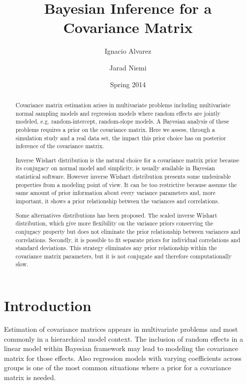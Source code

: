 \documentclass[a4paper]{article}
\title{Bayesian Inference for a Covariance Matrix}
\author{Ignacio Alvarez \and Jarad Niemi \nacho{We should probably include Matt on this.}}
\date{ Spring 2014 }
\begin{document}
 
\maketitle 


\begin{abstract}
Covariance matrix estimation arises in multivariate problems including multivariate normal sampling models and regression models where random effects are jointly modeled, e.g. random-intercept, random-slope models. A Bayesian analysis of these problems requires a prior on the covariance matrix. Here we assess, through a simulation study and a real data set, the impact this prior choice has on posterior inference of the covariance matrix.

Inverse Wishart distribution is the natural choice for a covariance matrix prior because its conjugacy on normal model and simplicity, is usually available in Bayesian statistical software. However inverse Wishart distribution presents some undesirable properties from a modeling point of view. It can be too restrictive because assume the same amount of prior information about every variance parameters and, more important, it shows a prior relationship between the variances and correlations.

Some alternatives distributions has been proposed. The scaled inverse Wishart distribution, which give more flexibility on the variance priors conserving the conjugacy property but does not eliminate the prior relationship between variances and correlations. Secondly, it is possible to fit separate priors for individual correlations and standard deviations. This strategy eliminates any prior relationship within the covariance matrix parameters, but it is not conjugate and therefore computationally slow. 
\end{abstract}


\newpage 

{} 

\section{Introduction} 

Estimation of covariance matrices appears in multivariate problems and most commonly in a hierarchical model context. The inclusion of random effects in a linear model within Bayesian framework may lead to modeling the covariance matrix for those effects. Also regression models with varying coefficients across groups is one of the most common situations where a prior for a covariance matrix is needed. 
\end{document}
